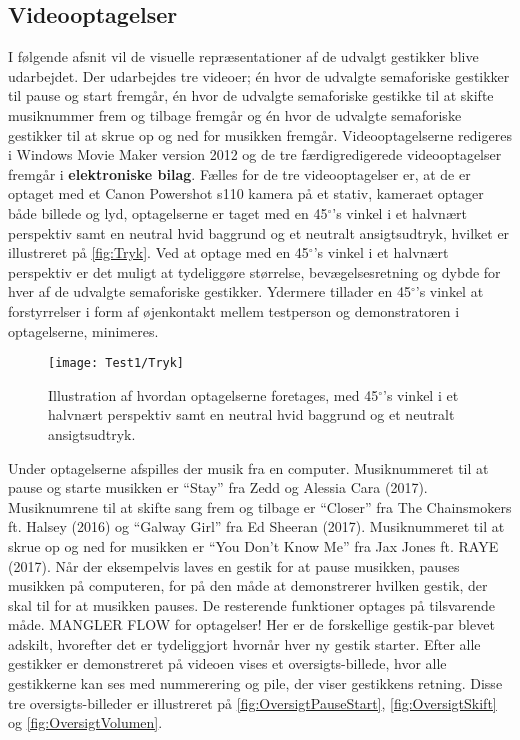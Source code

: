 \subsection{Videooptagelser}
\label{VideooptagelserValgAfGestikker}
%
I følgende afsnit vil de visuelle repræsentationer af de udvalgt gestikker blive udarbejdet. Der udarbejdes tre videoer; én hvor de udvalgte semaforiske gestikker til pause og start fremgår, én hvor de udvalgte semaforiske gestikke til at skifte musiknummer frem og tilbage fremgår og én hvor de udvalgte semaforiske gestikker til at skrue op og ned for musikken fremgår. Videooptagelserne redigeres i Windows Movie Maker version 2012 og de tre færdigredigerede videooptagelser fremgår i \textbf{elektroniske bilag}. 
\blankline
%
Fælles for de tre videooptagelser er, at de er optaget med et Canon Powershot s110 kamera på et stativ, kameraet optager både billede og lyd, optagelserne er taget med en 45$^{\circ}$'s vinkel i et halvnært perspektiv samt en neutral hvid baggrund og et neutralt ansigtsudtryk, hvilket er illustreret på \autoref{fig:Tryk}. Ved at optage med en 45$^{\circ}$'s vinkel i et halvnært perspektiv er det muligt at tydeliggøre størrelse, bevægelsesretning og dybde for hver af de udvalgte semaforiske gestikker. Ydermere tillader en 45$^{\circ}$'s vinkel at forstyrrelser i form af øjenkontakt mellem testperson og demonstratoren i optagelserne, minimeres. 
%
\begin{figure}[H]
	\centering
	\texttt{[image: Test1/Tryk]}
	\caption{Illustration af hvordan optagelserne foretages, med 45$^{\circ}$'s vinkel i et halvnært perspektiv samt en neutral hvid baggrund og et neutralt ansigtsudtryk.}
	\label{fig:Tryk}
\end{figure}
\noindent
%
Under optagelserne afspilles der musik fra en computer. Musiknummeret til at pause og starte musikken er \enquote{Stay} fra Zedd og Alessia Cara (2017). Musiknumrene til at skifte sang frem og tilbage er \enquote{Closer} fra The Chainsmokers ft. Halsey (2016) og \enquote{Galway Girl} fra Ed Sheeran (2017). Musiknummeret til at skrue op og ned for musikken er \enquote{You Don't Know Me} fra Jax Jones ft. RAYE (2017). Når der eksempelvis laves en gestik for at pause musikken, pauses musikken på computeren, for på den måde at demonstrerer hvilken gestik, der skal til for at musikken pauses. De resterende funktioner optages på tilsvarende måde.\blankline
%   
MANGLER FLOW for optagelser!\blankline
%
Her er de forskellige gestik-par blevet adskilt, hvorefter det er tydeliggjort hvornår hver ny gestik starter. Efter alle gestikker er demonstreret på videoen vises et oversigts-billede, hvor alle gestikkerne kan ses med nummerering og pile, der viser gestikkens retning. Disse tre oversigts-billeder er illustreret på \autoref{fig:OversigtPauseStart}, \autoref{fig:OversigtSkift} og \autoref{fig:OversigtVolumen}.
